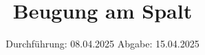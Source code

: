 

\subject{v406}
\title{Beugung am Spalt}
\date{%
  Durchführung: 08.04.2025
  \hspace{3em}
  Abgabe: 15.04.2025
}



\maketitle
\thispagestyle{empty}
\tableofcontents
\newpage






\printbibliography{}


